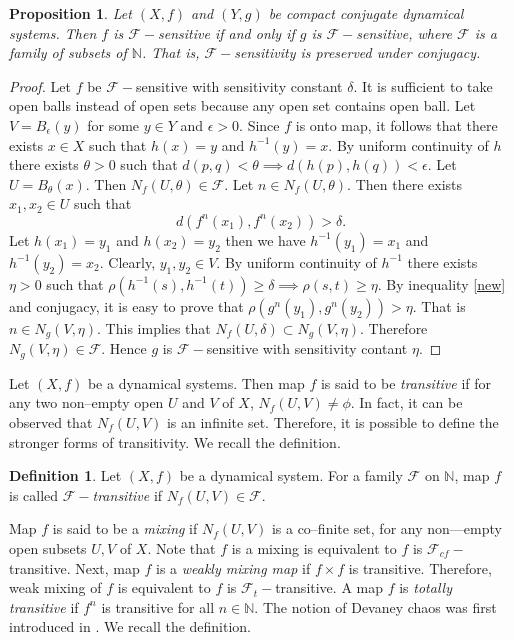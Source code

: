 \documentclass{amsart}[12pt, papera4]
\newtheorem{proposition}[theorem]{Proposition}
\theoremstyle{definition}
\newtheorem{definition}[theorem]{Definition}
\theoremstyle{remark}
\numberwithin{equation}{section}
\def\N{{\mathbb N}}
\def\F{{\mathscr{F}}}
\begin{document}
\begin{proposition}
	Let $(X,f)$ and $(Y,g)$ be compact conjugate dynamical systems. Then $f$ is $\F-$sensitive if and only if $g$ is $\F-$sensitive, where $\F$ is a family of subsets of $\N$. That is, $\F-$sensitivity is preserved under conjugacy.
\end{proposition}
\begin{proof}
	Let $f$ be $\F-$sensitive with sensitivity constant $\delta$. It is sufficient to take open balls instead of open sets because any open set contains open ball. Let $V=B_{\epsilon}(y)$ for some $y\in Y$ and $\epsilon>0$. Since $f$ is onto map, it follows that there exists $x\in X$ such that $h(x)=y$ and $h^{-1}(y)=x$. By uniform continuity of $h$ there exists $\theta>0$ such that $d(p,q)<\theta \implies d(h(p),h(q))<\epsilon$. Let $U=B_{\theta}(x)$. Then $N_f(U,\theta)\in \F$. Let $n\in N_f(U,\theta)$. Then there exists $x_1,x_2\in U$ such that 
	\begin{equation}\label{new}
		d(f^n(x_1),f^n(x_2))>\delta. 
	\end{equation}
	Let $h(x_1)=y_1$ and $h(x_2)=y_2$ then we have $h^{-1}(y_1)=x_1$ and $h^{-1}(y_2)=x_2$. Clearly, $y_1,y_2\in V$. By uniform continuity of $h^{-1}$ there exists $\eta>0$ such that $\rho(h^{-1}(s),h^{-1}(t))\geq \delta \implies \rho(s,t)\geq \eta$. By inequality \ref{new} and conjugacy, it is easy to prove that %
	$\rho(g^n(y_1),g^n(y_2))>\eta$. That is $n\in N_g(V,\eta)$. This implies that $N_f(U,\delta)\subset N_g(V,\eta)$. Therefore $N_g(V,\eta)\in \F$. Hence $g$ is $\F-$sensitive with sensitivity contant $\eta$.  
\end{proof}


\noindent Let $(X, f)$ be a dynamical systems. Then map $f$  is said to be \emph{transitive} if for any two non--empty open $U$ and $V$ of $X$, $N_f(U,V)\neq \phi$. In fact, it can be observed that $N_f(U,V)$ is an infinite set. Therefore, it is possible to define the stronger forms of transitivity. We recall the definition.

\smallskip	
\begin{definition}
	Let $(X, f)$ be a dynamical system. For a family $\mathscr{F}$ on $\N$, map $f$ is called \emph{$\mathscr{F}-$transitive} if $N_f(U,V)\in \mathscr{F}$. 
\end{definition}

\smallskip
\noindent Map $f$ is said to be a \textit{mixing} if $N_f(U,V)$ is a co--finite set, for any non---empty open subsets $U, V$ of $X$. Note that $f$ is a mixing is equivalent to $f$ is $\F_{cf}-$transitive. Next, map $f$ is a \emph{weakly mixing map}  if $f\times f$ is transitive. Therefore, weak mixing of $f$ is equivalent to $f$ is $\F_t-$transitive. A map $f$ is \emph{totally transitive} if $f^n$ is transitive for all $n\in \mathbb{N}$.  The notion of Devaney chaos was first introduced in \cite{RL}. We recall the definition.
\end{document}

